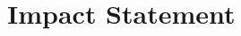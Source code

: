 \documentclass{article}
\theoremstyle{plain}
\theoremstyle{definition}
\theoremstyle{remark}
\begin{document}

\section*{Impact Statement}
\end{document}
